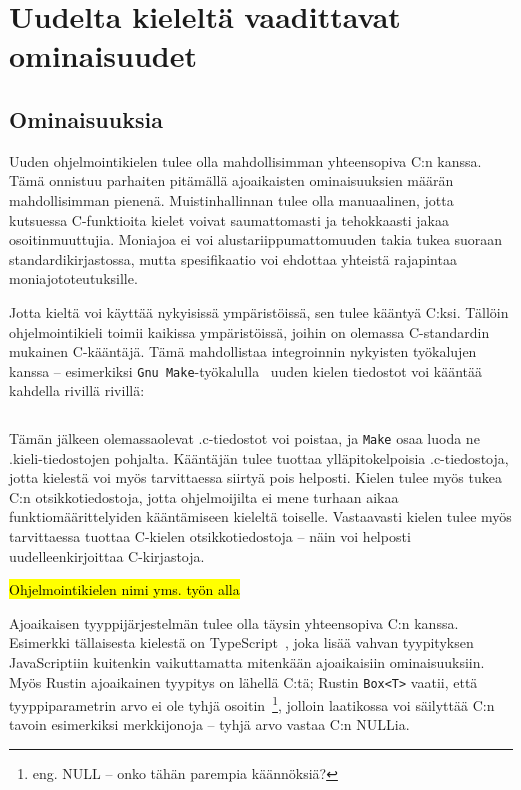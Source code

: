 \section{Uudelta kieleltä vaadittavat ominaisuudet}

\subsection{Ominaisuuksia}

Uuden ohjelmointikielen tulee olla mahdollisimman yhteensopiva C:n kanssa. Tämä
onnistuu parhaiten pitämällä ajoaikaisten ominaisuuksien määrän mahdollisimman
pienenä. Muistinhallinnan tulee olla manuaalinen, jotta kutsuessa C-funktioita
kielet voivat saumattomasti ja tehokkaasti jakaa osoitinmuuttujia. Moniajoa ei
voi alustariippumattomuuden takia tukea suoraan standardikirjastossa, mutta
spesifikaatio voi ehdottaa yhteistä rajapintaa moniajototeutuksille.

Jotta kieltä voi käyttää nykyisissä ympäristöissä, sen tulee kääntyä C:ksi.
Tällöin ohjelmointikieli toimii kaikissa ympäristöissä, joihin on olemassa
C-standardin mukainen C-kääntäjä. Tämä mahdollistaa integroinnin nykyisten
työkalujen kanssa -- esimerkiksi \texttt{Gnu Make}-työkalulla~\citep{gnumake}
uuden kielen tiedostot voi kääntää kahdella rivillä rivillä:

\inputminted{make}{Makefile.kieli}

Tämän jälkeen olemassaolevat .c-tiedostot voi poistaa, ja \texttt{Make} osaa
luoda ne .kieli-tiedostojen pohjalta. Kääntäjän tulee tuottaa ylläpitokelpoisia
.c-tiedostoja, jotta kielestä voi myös tarvittaessa siirtyä pois helposti.
Kielen tulee myös tukea C:n otsikkotiedostoja, jotta ohjelmoijilta ei mene
turhaan aikaa funktiomäärittelyiden kääntämiseen kieleltä toiselle. Vastaavasti
kielen tulee myös tarvittaessa tuottaa C-kielen otsikkotiedostoja -- näin voi
helposti uudelleenkirjoittaa C-kirjastoja.

\hl{Ohjelmointikielen nimi yms. työn alla}

Ajoaikaisen tyyppijärjestelmän tulee olla täysin yhteensopiva C:n kanssa.
Esimerkki tällaisesta kielestä on TypeScript~\citep{typescript}, joka lisää
vahvan tyypityksen JavaScriptiin kuitenkin vaikuttamatta mitenkään ajoaikaisiin
ominaisuuksiin. Myös Rustin ajoaikainen tyypitys on lähellä C:tä; Rustin
\texttt{Box<T>} vaatii, että tyyppiparametrin arvo ei ole tyhjä
osoitin~\footnote{eng. NULL -- onko tähän parempia käännöksiä?}, jolloin
laatikossa voi säilyttää C:n tavoin esimerkiksi merkkijonoja -- tyhjä arvo
vastaa C:n NULLia.

